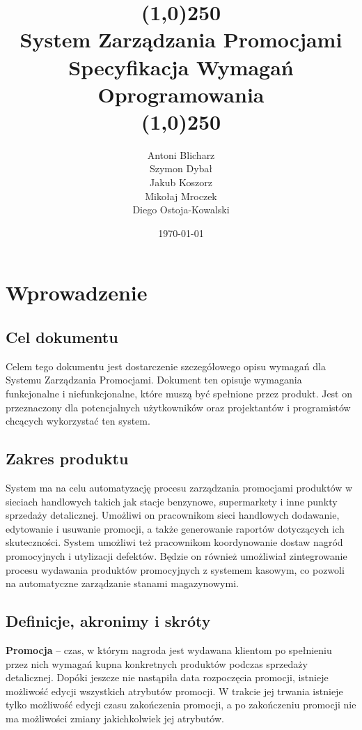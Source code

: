 \documentclass[a4paper,12pt]{article}
\title{
    \line(1,0){250}\\
    System Zarządzania Promocjami\\
    Specyfikacja Wymagań Oprogramowania\\
    \line(1,0){250}}
\author{Antoni Blicharz\\
        Szymon Dybał\\
        Jakub Koszorz\\
        Mikołaj Mroczek\\
        Diego Ostoja-Kowalski\\}
\date{\today}
\begin{document}
\begin{titlepage}
    \maketitle
\end{titlepage}
\tableofcontents
\newpage

\section{Wprowadzenie}

\subsection{Cel dokumentu}
Celem tego dokumentu jest dostarczenie szczegółowego opisu wymagań dla Systemu Zarządzania Promocjami.
Dokument ten opisuje wymagania funkcjonalne i niefunkcjonalne, które muszą być spełnione przez produkt.
Jest on przeznaczony dla potencjalnych użytkowników oraz projektantów i programistów chcących wykorzystać ten system.

\subsection{Zakres produktu}
System ma na celu automatyzację procesu zarządzania promocjami produktów w sieciach handlowych takich jak stacje benzynowe, supermarkety i inne punkty sprzedaży detalicznej.
Umożliwi on pracownikom sieci handlowych dodawanie, edytowanie i usuwanie promocji, a także generowanie raportów dotyczących ich skuteczności.
System umożliwi też pracownikom koordynowanie dostaw nagród promocyjnych i utylizacji defektów.
Będzie on również umożliwiał zintegrowanie procesu wydawania produktów promocyjnych z systemem kasowym, co pozwoli na automatyczne zarządzanie stanami magazynowymi.


\subsection{Definicje, akronimy i skróty}

\textbf{Promocja} -- czas, w którym nagroda jest wydawana klientom po spełnieniu przez nich wymagań kupna konkretnych produktów podczas sprzedaży detalicznej.
Dopóki jeszcze nie nastąpiła data rozpoczęcia promocji, istnieje możliwość edycji wszystkich atrybutów promocji.
W trakcie jej trwania istnieje tylko możliwość edycji czasu zakończenia promocji, a po zakończeniu promocji nie ma możliwości zmiany jakichkolwiek jej atrybutów.
\end{document}
